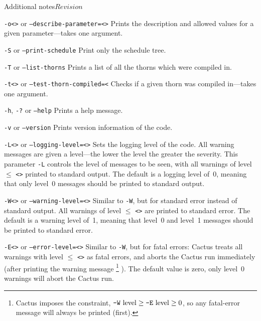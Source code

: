 \begin{cactuspart}{Additional notes}{}{$Revision$}
\begin{Lentry}
\item [\texttt{-o<\var{param}>} or \texttt{--describe-parameter=<\var{param}>}]
Prints the description and allowed values for a given parameter---takes one
argument.

\item [\texttt{-S} or \texttt{--print-schedule}]
Print only the schedule tree.

\item [\texttt{-T} or \texttt{--list-thorns}]
Prints a list of all the thorns which were compiled in.

\item [\texttt{-t<\var{arrangement or thorn}>} or \texttt{--test-thorn-compiled=<\var{arrangement or thorn>}} ]
Checks if a given thorn was compiled in---takes one argument.

\item [\texttt{-h}, \texttt{-?} or \texttt{--help}]
Prints a help message.

\item [\texttt{-v} or \texttt{--version}]
Prints version information of the code.


\item [\texttt{-L<\var{level}>} or \texttt{--logging-level=<\var{level}>}]
Sets the logging level of the code.  All warning messages are given a
level---the lower the level the greater the severity.  This
parameter \texttt{-L} controls the level of messages to be seen, with all
warnings of level $\le$ \texttt{<>} printed to standard output.  The
default is a logging level of~0, meaning that only level~0 messages
should be printed to standard output.

\item [\texttt{-W<\var{level}>} or \texttt{--warning-level=<\var{level}>}]
Similar to \texttt{-W}, but for standard error instead of
standard output.  All warnings of level $\le$ \texttt{<>} are
printed to standard error.  The default is a warning level of~1,
meaning that level~0 and level~1 messages should be printed to
standard error.

\item [\texttt{-E<\var{level}>} or \texttt{--error-level=<\var{level}>}]
Similar to \texttt{-W}, but for fatal errors: Cactus treats all
warnings with level $\le$ \texttt{<>} as fatal errors, and aborts
the Cactus run immediately (after printing the warning message%
\footnote{%
         Cactus imposes the constraint,
         $\mbox{\texttt{-W} level} \ge \mbox{\texttt{-E} level} \ge 0$,
         so any fatal-error message will always be printed (first).
         }%
).  The default value is zero, \ie{} only level~0 warnings
will abort the Cactus run.


\end{Lentry}
\end{cactuspart}
